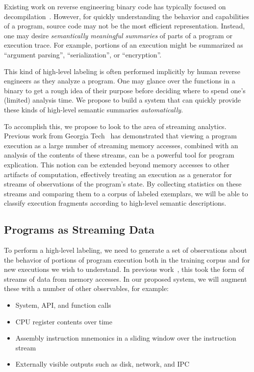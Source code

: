 Existing work on reverse engineering binary code has typically focused
on decompilation~\cite{schwartz:2013:decomp,cifuentes:1995:decomp}.
However, for quickly understanding the behavior and capabilities of a
program, source code may not be the most efficient representation.
Instead, one may desire \emph{semantically meaningful summaries} of
parts of a program or execution trace. For example, portions of an
execution might be summarized as ``argument parsing'',
``serialization'', or ``encryption''.

This kind of high-level labeling is often performed implicitly by human
reverse engineers as they analyze a program. One may glance over the
functions in a binary to get a rough idea of their purpose before
deciding where to spend one's (limited) analysis time. We propose to
build a system that can quickly provide these kinds of high-level
semantic summaries \emph{automatically}. 

To accomplish this, we propose to look to the area of streaming
analytics. Previous work from Georgia Tech~\cite{dolangavitt:2013:tzb}
has demonstrated that viewing a program execution as a large number of
streaming memory accesses, combined with an analysis of the contents of
these streams, can be a powerful tool for program explication. This
notion can be extended beyond memory accesses to other artifacts of
computation, effectively treating an execution as a generator for
streams of observations of the program's state. By collecting statistics
on these streams and comparing them to a corpus of labeled exemplars, we
will be able to classify execution fragments according to high-level
semantic descriptions.

\subsection{Programs as Streaming Data}

To perform a high-level labeling, we need to generate a set of
observations about the behavior of portions of program execution both in
the training corpus and for new executions we wish to understand. In
previous work~\cite{dolangavitt:2013:tzb}, this took the form of streams
of data from memory accesses. In our proposed system, we will augment
these with a number of other observables, for example:

\begin{itemize}
    \item System, API, and function calls
    \item CPU register contents over time
    \item Assembly instruction mnemonics in a sliding window over the
    instruction stream
    \item Externally visible outputs such as disk, network, and IPC
\end{itemize}

